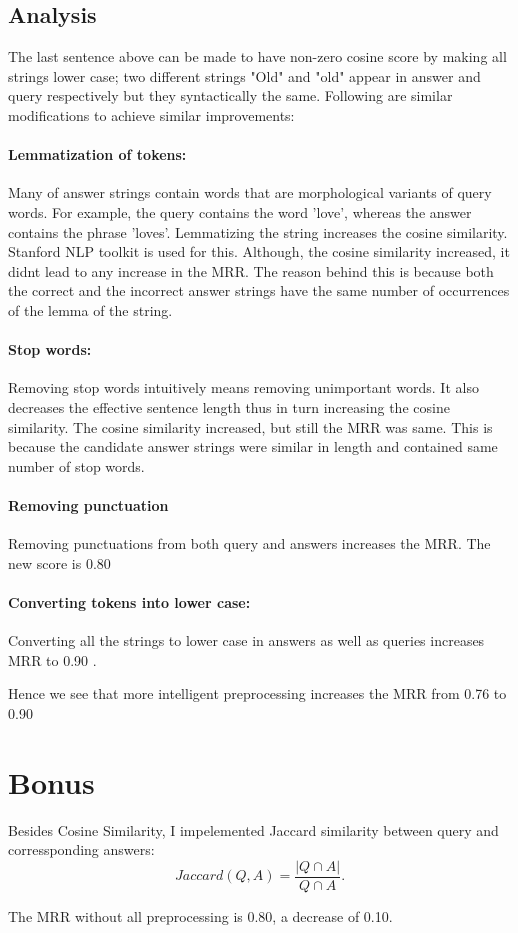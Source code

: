 \documentclass{article}
\begin{document}
\subsection{Analysis}
The last sentence above can be made to have non-zero cosine score by making all 
strings lower case; two different strings "Old" and "old" appear in answer and query
respectively but they syntactically the same. Following are similar modifications 
to achieve similar improvements:     

\paragraph{Lemmatization of tokens:} Many of answer strings contain words that are morphological 
variants of query words. For example, the query contains the word 'love', 
whereas the answer contains the phrase 'loves'. Lemmatizing the string increases 
the cosine similarity. Stanford NLP toolkit is used for this. Although, the cosine 
similarity increased, it didnt lead to any increase in the MRR. The reason behind 
this is because both the correct and the incorrect answer strings have the same 
number of occurrences of the lemma of the string. 


\paragraph{Stop words:} Removing stop words intuitively means removing unimportant words.
It also decreases the effective sentence length thus in turn increasing the cosine 
similarity. The cosine similarity increased, but still the MRR was same. This is 
because the candidate answer strings were similar in length and contained 
same number of stop words. 

\paragraph{Removing punctuation} Removing punctuations from both query and answers
increases the MRR. The new score is 0.80

\paragraph{Converting tokens into lower case:} Converting all the strings to lower 
case in answers as well as queries increases MRR to 0.90 .

Hence we see that more intelligent preprocessing increases the MRR from 0.76 to 0.90

\section{Bonus}

Besides Cosine Similarity, I impelemented Jaccard similarity between query and 
corressponding answers:
\begin{equation}
Jaccard(Q,A) = \frac{|Q\cap A|} {Q\cap A}.
\end{equation}

The MRR  without all preprocessing is 0.80, a decrease of 0.10.

%
%
\end{document}
